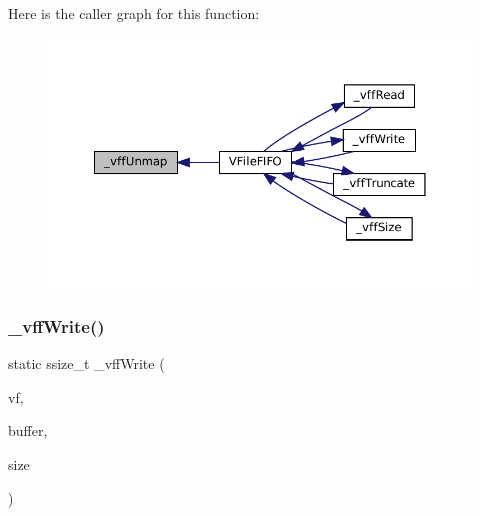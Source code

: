 Here is the caller graph for this function\+:
\nopagebreak
\begin{figure}[H]
\begin{center}
\leavevmode
\includegraphics[width=350pt]{vfs-fifo_8c_a359856c1b2b58f1cb08c962ff0bbd6f7_icgraph}
\end{center}
\end{figure}
\mbox{\label{vfs-fifo_8c_a9edb7182cfa99285402b489ff82d31f5}} 
\subsubsection{\texorpdfstring{\+\_\+vff\+Write()}{\_vffWrite()}}
{\footnotesize\ttfamily static ssize\+\_\+t \+\_\+vff\+Write (\begin{DoxyParamCaption}\item[{struct V\+File $\ast$}]{vf,  }\item[{const void $\ast$}]{buffer,  }\item[{size\+\_\+t}]{size }\end{DoxyParamCaption})\hspace{0.3cm}{\ttfamily [static]}}

